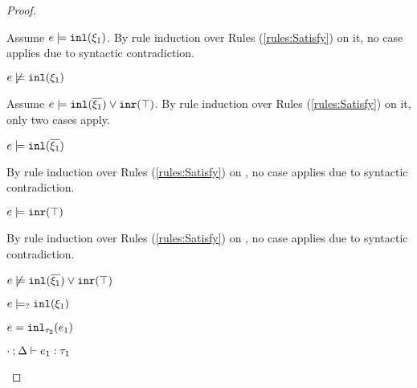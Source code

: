 \begin{proof}
\begin{byCases}
\begin{byCases}
\begin{pfsteps*}
        \end{pfsteps*}
        Assume $e \models \mathtt{inl}(\xi_1)$. By rule induction over Rules (\ref{rules:Satisfy}) on it, no case applies due to syntactic contradiction.
        \begin{pfsteps*}
        \item $e \not\models \mathtt{inl}(\xi_1)$  
        \end{pfsteps*}
        Assume $e \models \mathtt{inl}(\overline{\xi_1}) \vee \mathtt{inr}(\top)$. By rule induction over Rules (\ref{rules:Satisfy}) on it, only two cases apply.
        \begin{byCases}
        \item[\text{(\ref{rule:CSOr1})}]
            \begin{pfsteps*}
            \item $e \models \mathtt{inl}(\overline{\xi_1})$  
            \end{pfsteps*}
            By rule induction over Rules (\ref{rules:Satisfy}) on , no case applies due to syntactic contradiction.
        \item[\text{(\ref{rule:CSOr2})}]
            \begin{pfsteps*}
            \item $e \models \mathtt{inr}(\top)$  
            \end{pfsteps*}
            By rule induction over Rules (\ref{rules:Satisfy}) on , no case applies due to syntactic contradiction.
        \end{byCases}
        \begin{pfsteps*}
        \item $e \not\models \mathtt{inl}(\overline{\xi_1}) \vee \mathtt{inr}(\top)$  
        \item $e \models_{?} \mathtt{inl}(\xi_1)$ 
        \end{pfsteps*}
    \item[\text{(\ref{rule:TInl})}]
        \begin{pfsteps*}
        \item $e=\mathtt{inl}_{\tau_2}({e_1})$ 
        \item $\cdot \mathbin{;} \Delta \vdash e_1 : \tau_1$  

\end{pfsteps*}
\end{byCases}
\end{byCases}
\end{proof}
